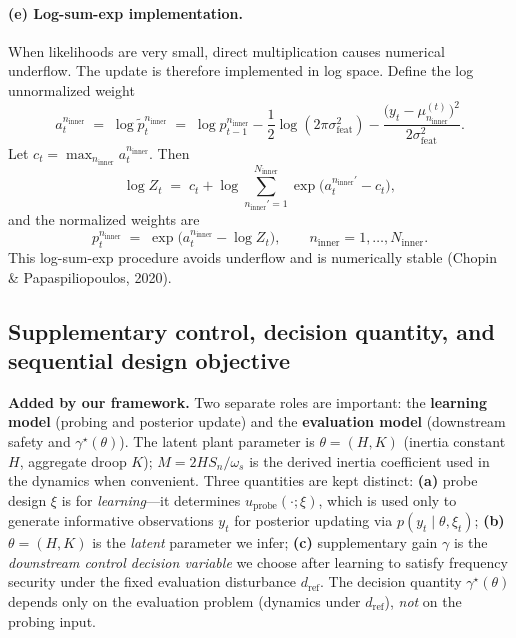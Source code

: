 \documentclass[10pt]{article}
\newcommand{\Ninner}{N_{\mathrm{inner}}}
\newcommand{\ninner}{n_{\mathrm{inner}}}
\begin{document}
\paragraph{(e) Log-sum-exp implementation.}
When likelihoods are very small, direct multiplication causes numerical underflow. The update is therefore implemented in log space. Define the log unnormalized weight
\begin{equation}
a_t^{\ninner}\;=\;\log \tilde p_t^{\ninner}\;=\;\log p_{t-1}^{\ninner}-\frac{1}{2}\log(2\pi\sigma_{\mathrm{feat}}^2)-\frac{\big(y_t-\mu_{\ninner}^{(t)}\big)^2}{2\sigma_{\mathrm{feat}}^2}.
\end{equation}
Let $c_t=\max_{\ninner} a_t^{\ninner}$. Then
\begin{equation}
\log Z_t\;=\;c_t+\log\sum_{\ninner'=1}^{\Ninner}\exp\big(a_t^{\ninner'}-c_t\big),
\end{equation}
and the normalized weights are
\begin{equation}
p_t^{\ninner}\;=\;\exp\big(a_t^{\ninner}-\log Z_t\big),\qquad \ninner=1,\dots,\Ninner.
\end{equation}
This log-sum-exp procedure avoids underflow and is numerically stable (Chopin \& Papaspiliopoulos, 2020).


\subsection{Supplementary control, decision quantity, and sequential design objective}
\label{sec:decision}

\textbf{Added by our framework.}
Two separate roles are important: the \textbf{learning model} (probing and posterior update) and the \textbf{evaluation model} (downstream safety and $\gamma^\star(\theta)$). The latent plant parameter is $\theta=(H,K)$ (inertia constant $H$, aggregate droop $K$); $M=2HS_n/\omega_s$ is the derived inertia coefficient used in the dynamics when convenient. Three quantities are kept distinct: \textbf{(a)} probe design $\xi$ is for \emph{learning}---it determines $u_{\mathrm{probe}}(\cdot;\xi)$, which is used only to generate informative observations $y_t$ for posterior updating via $p(y_t\mid\theta,\xi_t)$; \textbf{(b)} $\theta=(H,K)$ is the \emph{latent} parameter we infer; \textbf{(c)} supplementary gain $\gamma$ is the \emph{downstream control decision variable} we choose after learning to satisfy frequency security under the fixed evaluation disturbance $d_{\mathrm{ref}}$. The decision quantity $\gamma^\star(\theta)$ depends only on the evaluation problem (dynamics under $d_{\mathrm{ref}}$), \emph{not} on the probing input.
\end{document}
